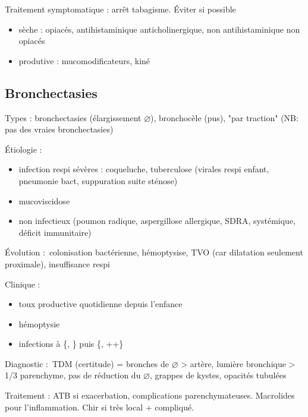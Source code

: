 \documentclass{article}
\begin{document}
Traitement symptomatique : arrêt tabagisme. Éviter si possible
\begin{itemize}
  \item sèche : opiacés, antihistaminique anticholinergique, non
    antihistaminique non opiacés
  \item produtive : mucomodificateurs, kiné
\end{itemize}

\subsection{Bronchectasies}
\label{sub:bronchectasies}
Types : bronchectasies (élargissement $\diameter$), bronchocèle (pus), "par
traction" (NB: pas des vraies bronchectasies)


Étiologie : 
\begin{itemize}
  \item infection respi sévères : coqueluche, tuberculose (virales respi enfant,
    pneumonie bact, suppuration suite sténose)
  \item mucoviscidose
  \item non infectieux (poumon radique, aspergillose allergique, SDRA,
    systémique, déficit immunitaire)
\end{itemize}

Évolution : colonisation bactérienne, hémoptysise, TVO (car dilatation seulement
proximale), insuffisance respi

Clinique :
\begin{itemize}
  \item toux productive quotidienne depuis l'enfance
  \item hémoptysie
  \item infections à \{, \} puis \{,
    ++\}
\end{itemize}

Diagnostic : TDM (certitude) = bronches de $\diameter$ > artère, lumière
bronchique > 1/3 parenchyme, pas de réduction du $\diameter$, grappes de kystes,
opacités tubulées

Traitement : ATB si exacerbation, complications parenchymateuses. Macrolides
pour l'inflammation. Chir si très local + compliqué.
\end{document}
